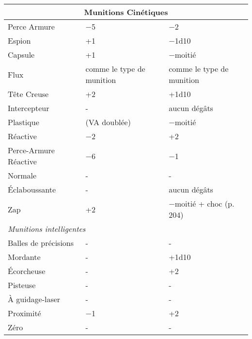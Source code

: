 \begin{table} \begin{tabular}{|l|l|l|} \hline

\multicolumn{3}{|c|}{\textbf{Munitions Cinétiques}} \\ \hline

Perce Armure	&$-$5	&$-$2 \\ \hline

Espion	&+1	&$-$1d10 \\ \hline

Capsule	&+1	&$-$moitié \\ \hline

Flux	&comme le type de munition	&comme le type de munition \\ \hline

Tête Creuse	&+2	&+1d10 \\ \hline

Intercepteur	&- &aucun dégâts \\ \hline

Plastique	&(VA doublée)	&$-$moitié \\ \hline

Réactive	&$-$2	&+2 \\ \hline

Perce-Armure Réactive	&$-$6	&$-$1 \\ \hline

Normale	&- &- \\ \hline

Éclaboussante	&- &aucun dégâts \\ \hline

Zap	&+2	&$-$moitié + choc (p. 204) \\ \hline

\multicolumn{3}{|l|}{\emph{Munitions intelligentes}} \\ \hline

Balles de précisions	&- &- \\ \hline

Mordante	&- &+1d10 \\ \hline

Écorcheuse	&- &+2 \\ \hline

Pisteuse	&- &- \\ \hline

À guidage-laser	&- &- \\ \hline

Proximité	&$-$1	&+2 \\ \hline

Zéro	&- &- \\ \hline

\end{tabular} \label{tab:kinetic-ammo} \end{table} 



